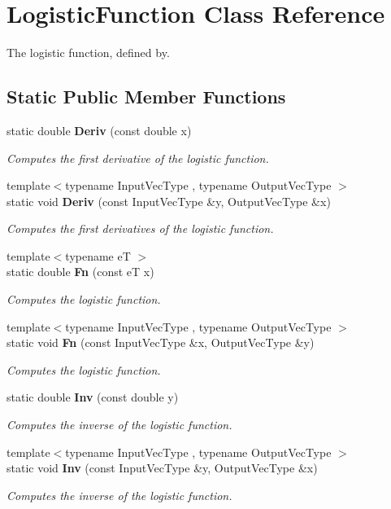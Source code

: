 \section{Logistic\+Function Class Reference}
\label{classmlpack_1_1ann_1_1LogisticFunction}


The logistic function, defined by.  


\subsection*{Static Public Member Functions}
\begin{DoxyCompactItemize}
\item 
static double \textbf{ Deriv} (const double x)
\begin{DoxyCompactList}\small\item\em Computes the first derivative of the logistic function. \end{DoxyCompactList}\item 
{\footnotesize template$<$typename Input\+Vec\+Type , typename Output\+Vec\+Type $>$ }\\static void \textbf{ Deriv} (const Input\+Vec\+Type \&y, Output\+Vec\+Type \&x)
\begin{DoxyCompactList}\small\item\em Computes the first derivatives of the logistic function. \end{DoxyCompactList}\item 
{\footnotesize template$<$typename eT $>$ }\\static double \textbf{ Fn} (const eT x)
\begin{DoxyCompactList}\small\item\em Computes the logistic function. \end{DoxyCompactList}\item 
{\footnotesize template$<$typename Input\+Vec\+Type , typename Output\+Vec\+Type $>$ }\\static void \textbf{ Fn} (const Input\+Vec\+Type \&x, Output\+Vec\+Type \&y)
\begin{DoxyCompactList}\small\item\em Computes the logistic function. \end{DoxyCompactList}\item 
static double \textbf{ Inv} (const double y)
\begin{DoxyCompactList}\small\item\em Computes the inverse of the logistic function. \end{DoxyCompactList}\item 
{\footnotesize template$<$typename Input\+Vec\+Type , typename Output\+Vec\+Type $>$ }\\static void \textbf{ Inv} (const Input\+Vec\+Type \&y, Output\+Vec\+Type \&x)
\begin{DoxyCompactList}\small\item\em Computes the inverse of the logistic function. \end{DoxyCompactList}\end{DoxyCompactItemize}


